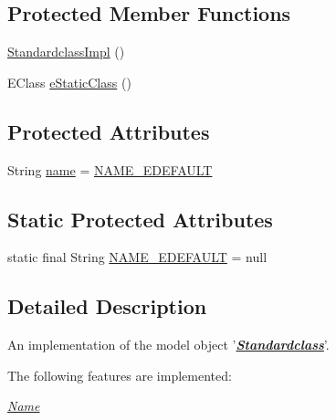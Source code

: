 \subsection*{Protected Member Functions}
\begin{DoxyCompactItemize}
\item 
\hyperlink{classshootingmachineemfmodel_1_1impl_1_1_standardclass_impl_a4fe70e5a67bb2a070fed88a552f4933e}{Standardclass\-Impl} ()
\item 
E\-Class \hyperlink{classshootingmachineemfmodel_1_1impl_1_1_standardclass_impl_aea12f45062e8de84aa1c6578d756fead}{e\-Static\-Class} ()
\end{DoxyCompactItemize}
\subsection*{Protected Attributes}
\begin{DoxyCompactItemize}
\item 
String \hyperlink{classshootingmachineemfmodel_1_1impl_1_1_standardclass_impl_a4f6c3a5c981880bce8b5042f582d5739}{name} = \hyperlink{classshootingmachineemfmodel_1_1impl_1_1_standardclass_impl_a9b5409548f5c6e9e0919e4dc6c0d0842}{N\-A\-M\-E\-\_\-\-E\-D\-E\-F\-A\-U\-L\-T}
\end{DoxyCompactItemize}
\subsection*{Static Protected Attributes}
\begin{DoxyCompactItemize}
\item 
static final String \hyperlink{classshootingmachineemfmodel_1_1impl_1_1_standardclass_impl_a9b5409548f5c6e9e0919e4dc6c0d0842}{N\-A\-M\-E\-\_\-\-E\-D\-E\-F\-A\-U\-L\-T} = null
\end{DoxyCompactItemize}


\subsection{Detailed Description}
An implementation of the model object '{\itshape {\bfseries \hyperlink{interfaceshootingmachineemfmodel_1_1_standardclass}{Standardclass}}}'.

The following features are implemented\-: 
\begin{DoxyItemize}
\item \hyperlink{classshootingmachineemfmodel_1_1impl_1_1_standardclass_impl_adfab6dbafe989bbcb5310c704caa683b}{{\itshape Name}} 
\end{DoxyItemize}

